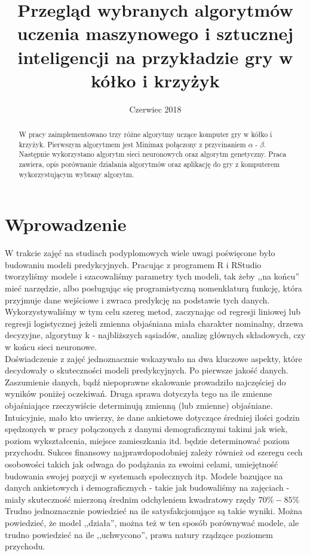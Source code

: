 \documentclass[licencjacka]{pracamgr}
\title{Przegląd wybranych algorytmów uczenia maszynowego i sztucznej inteligencji na przykładzie gry w kółko i krzyżyk}
\date{Czerwiec 2018}
\begin{document}
\maketitle
\begin{abstract}
  W pracy zaimplementowano trzy różne algorytmy uczące komputer gry w kółko i krzyżyk. Pierwszym algorytmem jest Minimax połączony z przycinaniem $\alpha$ - $\beta$. Następnie wykorzystano algorytm sieci neuronowych oraz algorytm genetyczny. Praca zawiera, opis porównanie działania algorytmów oraz aplikację do gry z komputerem wykorzystującym wybrany algorytm.
\end{abstract}

\tableofcontents


\chapter*{Wprowadzenie}

W trakcie zajęć na studiach podyplomowych wiele uwagi poświęcone było budowaniu modeli predykcyjnych. Pracując z  programem R  i RStudio tworzyliśmy modele i szacowaliśmy parametry tych modeli, tak żeby ,,na końcu'' mieć narzędzie, albo posługując się programistyczną nomenklaturą funkcję, która przyjmuje dane wejściowe i zwraca predykcję na podstawie tych danych. Wykorzystywaliśmy w tym celu szereg metod, zaczynając od regresji liniowej lub regresji logistycznej jeżeli zmienna objaśniana miała charakter nominalny, drzewa decyzyjne,  algorytmy k - najbliższych sąsiadów, analizę głównych składowych, czy w końcu sieci neuronowe.  \\

Doświadczenie z zajęć jednoznacznie wskazywało na dwa kluczowe aspekty, które decydowały o skuteczności modeli predykcyjnych. Po pierwsze jakość danych. Zaszumienie danych, bądź niepoprawne skalowanie prowadziło najczęściej do wyników poniżej oczekiwań. Druga sprawa dotyczyła tego na ile zmienne objaśniające rzeczywiście determinują zmienną (lub zmienne) objaśniane. Intuicyjnie, mało kto uwierzy, że dane ankietowe dotyczące średniej ilości godzin spędzonych w pracy połączonych z danymi demograficznymi takimi jak wiek, poziom wykształcenia, miejsce zamieszkania itd. będzie determinować poziom przychodu. Sukces finansowy najprawdopodobniej zależy również od szeregu cech osobowości takich jak odwaga do podążania za swoimi celami, umiejętność budowania swojej pozycji w systemach społecznych itp.  Modele bazujące na danych ankietowych i demograficznych - takie jak budowaliśmy na zajęciach - miały skuteczność mierzoną średnim odchyleniem kwadratowy rzędy $70\% - 85\%$  Trudno jednoznacznie powiedzieć na ile satysfakcjonujące są takie wyniki. Można powiedzieć, że model ,,działa'', można też w ten sposób porównywać modele, ale trudno powiedzieć na ile ,,uchwycono'',  prawa natury rządzące poziomem przychodu.\\
 
\end{document}

